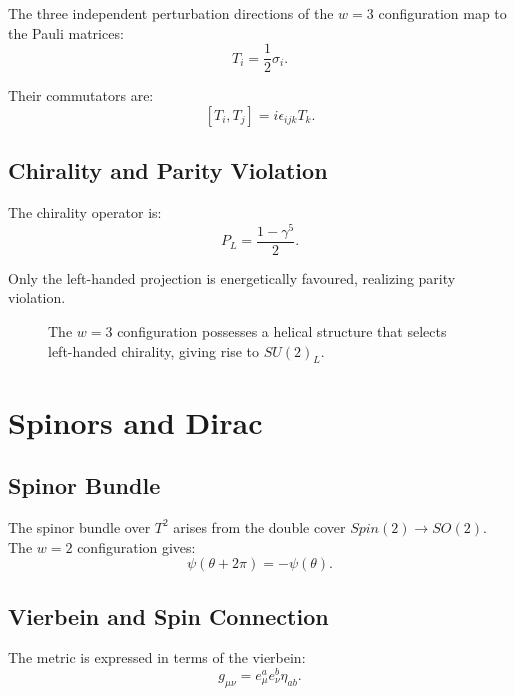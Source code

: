 \documentclass[12pt,oneside]{book}
\begin{document}
The three independent perturbation directions of the $w=3$ configuration map to the Pauli matrices:
\[
T_i = \frac{1}{2}\sigma_i.
\]

Their commutators are:
\[
[T_i, T_j] = i\epsilon_{ijk} T_k.
\]

\section{Chirality and Parity Violation}

The chirality operator is:
\[
P_L = \frac{1-\gamma^5}{2}.
\]

Only the left-handed projection is energetically favoured, realizing parity violation.

\begin{figure}[H]
\centering
{}
\caption{The $w=3$ configuration possesses a helical structure that selects left-handed chirality, giving rise to $SU(2)_L$.}
\label{fig:w3_chiral}
\end{figure}

\chapter{Spinors and Dirac}

\section{Spinor Bundle}

The spinor bundle over $T^2$ arises from the double cover $Spin(2)\to SO(2)$. The $w=2$ configuration gives:
\[
\psi(\theta+2\pi) = -\psi(\theta).
\]

\section{Vierbein and Spin Connection}

The metric is expressed in terms of the vierbein:
\[
g_{\mu\nu} = e_\mu^a e_\nu^b \eta_{ab}.
\]
\end{document}
